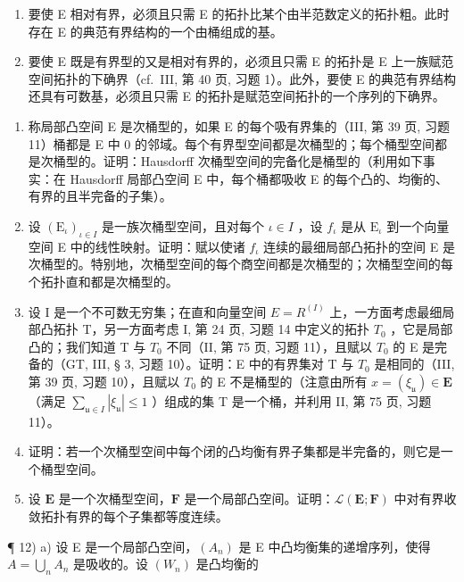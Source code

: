 \begin{enumerate}
\def\labelenumi{\alph{enumi})}
\item
  要使 E 相对有界，必须且只需 E 的拓扑比某个由半范数定义的拓扑粗。此时存在 E 的典范有界结构的一个由桶组成的基。
\item
  要使 E 既是有界型的又是相对有界的，必须且只需 E 的拓扑是 E 上一族赋范空间拓扑的下确界（cf.~III, 第 40 页, 习题 1）。此外，要使 E 的典范有界结构还具有可数基，必须且只需 E 的拓扑是赋范空间拓扑的一个序列的下确界。
\end{enumerate}

\begin{enumerate}
\def\labelenumi{\arabic{enumi})}
\setcounter{enumi}{6}
\item
  称局部凸空间 E 是次桶型的，如果 E 的每个吸有界集的（III, 第 39 页, 习题 11）桶都是 E 中 0 的邻域。每个有界型空间都是次桶型的；每个桶型空间都是次桶型的。证明：Hausdorff 次桶型空间的完备化是桶型的（利用如下事实：在 Hausdorff 局部凸空间 E 中，每个桶都吸收 E 的每个凸的、均衡的、有界的且半完备的子集）。
\item
  设 \((\mathrm{E}_{\iota})_{\iota\in I}\) 是一族次桶型空间，且对每个 \(\iota\in I\) ，设 \(f_{\iota}\) 是从 \(\mathrm{E}_{\iota}\) 到一个向量空间 E 中的线性映射。证明：赋以使诸 \(f_{\iota}\) 连续的最细局部凸拓扑的空间 E 是次桶型的。特别地，次桶型空间的每个商空间都是次桶型的；次桶型空间的每个拓扑直和都是次桶型的。
\item
  设 I 是一个不可数无穷集；在直和向量空间 \(E = R^{(I)}\) 上，一方面考虑最细局部凸拓扑 T，另一方面考虑 I, 第 24 页, 习题 14 中定义的拓扑 \(T_{0}\) ，它是局部凸的；我们知道 T 与 \(T_{0}\) 不同（II, 第 75 页, 习题 11），且赋以 \(T_{0}\) 的 E 是完备的（GT, III, § 3, 习题 10）。证明：E 中的有界集对 T 与 \(T_{0}\) 是相同的（III, 第 39 页, 习题 10），且赋以 \(T_{0}\) 的 E 不是桶型的（注意由所有 \(x = (\xi_{\mathfrak{u}}) \in \mathbf{E}\) （满足 \(\sum_{\mathfrak{u} \in I} |\xi_{\mathfrak{u}}| \leqslant 1\) ）组成的集 T 是一个桶，并利用 II, 第 75 页, 习题 11）。
\item
  证明：若一个次桶型空间中每个闭的凸均衡有界子集都是半完备的，则它是一个桶型空间。
\item
  设 \(\mathbf{E}\) 是一个次桶型空间，\(\mathbf{F}\) 是一个局部凸空间。证明：\(\mathcal{L}(\mathbf{E};\mathbf{F})\) 中对有界收敛拓扑有界的每个子集都等度连续。
\end{enumerate}

¶ 12) a) 设 E 是一个局部凸空间，\((A_n)\) 是 E 中凸均衡集的递增序列，使得 \(A = \bigcup_{n} A_n\) 是吸收的。设 \((W_n)\) 是凸均衡的

